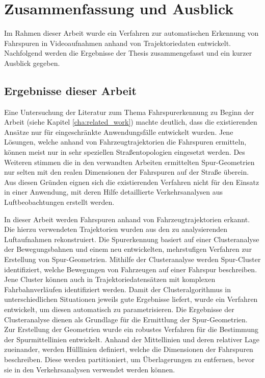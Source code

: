 
\chapter{Zusammenfassung und Ausblick}
\label{cha:end}

Im Rahmen dieser Arbeit wurde ein Verfahren zur automatischen Erkennung von Fahrspuren in Videoaufnahmen
anhand von Trajektoriedaten entwickelt.
Nachfolgend werden die Ergebnisse der Thesis zusammengefasst und ein kurzer Ausblick gegeben.

\section{Ergebnisse dieser Arbeit}

Eine Untersuchung der Literatur zum Thema Fahrspurerkennung zu Beginn der Arbeit
(siehe Kapitel \ref{cha:related_work}) machte deutlich, dass die existierenden Ansätze
nur für eingeschränkte Anwendungsfälle entwickelt wurden.
Jene Lösungen, welche anhand von Fahrzeugtrajektorien die Fahrspuren ermitteln, können meist nur
in sehr speziellen Straßentopologien eingesetzt werden.
Des Weiteren stimmen die in den verwandten Arbeiten ermittelten Spur-Geometrien nur selten mit den
realen Dimensionen der Fahrspuren auf der Straße überein.
Aus diesen Gründen eignen sich die existierenden Verfahren nicht für den Einsatz in einer
Anwendung, mit deren Hilfe detaillierte Verkehrsanalysen aus Luftbeobachtungen erstellt werden.

In dieser Arbeit werden Fahrspuren anhand von Fahrzeugtrajektorien erkannt. Die hierzu verwendeten Trajektorien
wurden aus den zu analysierenden Luftaufnahmen rekonstruiert.
Die Spurerkennung basiert auf einer Clusteranalyse der Bewegungsbahnen
und einem neu entwickelten, mehrstufigen Verfahren zur Erstellung von Spur-Geometrien.
Mithilfe der Clusteranalyse werden Spur-Cluster identifiziert, welche Bewegungen von Fahrzeugen auf einer Fahrspur beschreiben.
Jene Cluster können auch in Trajektoriedatensätzen mit komplexen Fahrbahnverläufen identifiziert werden.
Damit der Clusteralgorithmus in unterschiedlichen Situationen jeweils gute Ergebnisse liefert, wurde ein Verfahren
entwickelt, um diesen automatisch zu parametrisieren.
Die Ergebnisse der Clusteranalyse dienen als Grundlage für die Ermittlung der Spur-Geometrien.
Zur Erstellung der Geometrien wurde ein robustes Verfahren für die Bestimmung der Spurmittellinien entwickelt.
Anhand der Mittellinien und deren relativer Lage zueinander, werden Hülllinien definiert,
welche die Dimensionen der Fahrspuren beschreiben. Diese werden partitioniert,
um Überlagerungen zu entfernen, bevor sie in den Verkehrsanalysen verwendet werden können.

